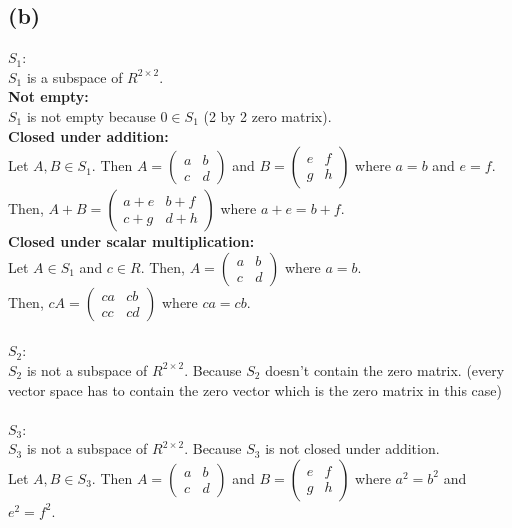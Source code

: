 \documentclass{article}
\begin{document}
\subsection*{(b)}
\(S_1\): \\
\(S_1\) is a subspace of \(R^{2 \times 2}\). \\
\textbf{Not empty:} \\
\(S_1\) is not empty because \(0 \in S_1\) (2 by 2 zero matrix). \\
\textbf{Closed under addition:} \\
Let \(A, B \in S_1\). Then \(A = \begin{pmatrix} a & b \\ c & d \end{pmatrix}\) and \(B = \begin{pmatrix} e & f \\ g & h \end{pmatrix}\) where \(a = b\) and \(e = f\). \\
Then, \(A + B = \begin{pmatrix} a + e & b + f \\ c + g & d + h \end{pmatrix}\) where \(a + e = b + f\). \\
\textbf{Closed under scalar multiplication:} \\
Let \(A \in S_1\) and \(c \in R\). Then, \(A = \begin{pmatrix} a & b \\ c & d \end{pmatrix}\) where \(a = b\). \\
Then, \(cA = \begin{pmatrix} ca & cb \\ cc & cd \end{pmatrix}\) where \(ca = cb\). \\
\\
\(S_2\): \\
\(S_2\) is not a subspace of \(R^{2 \times 2}\). Because \(S_2\) doesn't contain the zero matrix. (every vector space has to contain the zero vector which is the zero matrix in this case) \\
\\
\(S_3\): \\
\(S_3\) is not a subspace of \(R^{2 \times 2}\). Because \(S_3\) is not closed under addition. \\
Let \(A, B \in S_3\). Then \(A = \begin{pmatrix} a & b \\ c & d \end{pmatrix}\) and \(B = \begin{pmatrix} e & f \\ g & h \end{pmatrix}\) where \(a^2 = b^2\) and \(e^2 = f^2\). \\
\end{document}
